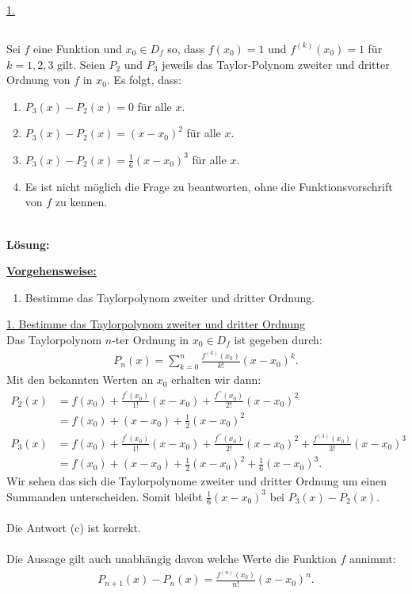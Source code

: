 \underline{1. }\\



\newpage
\subsection*{}
Sei $f$ eine Funktion und $x_0 \in D_f$ so, dass $f(x_0) = 1$ und $f^{(k)}(x_0) = 1$ für $k = 1,2,3$ gilt. Seien $P_2$ und $P_3$ jeweils das Taylor-Polynom zweiter und dritter Ordnung von $f$ in $x_0$. Es folgt, dass:
\renewcommand{\labelenumi}{(\alph{enumi})}
\begin{enumerate}
	\item 
	$P_3(x) - P_2(x) = 0 $ für alle $x$.
	\item
	$P_3(x) - P_2(x) = (x - x_0)^2 $ für alle $x$.
	\item
	$P_3(x) - P_2(x) = \frac{1}{6} (x - x_0)^3 $ für alle $x$.
	\item
	Es ist nicht möglich die Frage zu beantworten, ohne die Funktionsvorschrift von $f$ zu kennen.
\end{enumerate}
\ \\
\textbf{Lösung:}
\begin{mdframed}
	\underline{\textbf{Vorgehensweise:}}
	\renewcommand{\labelenumi}{\theenumi.}
	\begin{enumerate}
		\item Bestimme das Taylorpolynom zweiter und dritter Ordnung.
	\end{enumerate}
\end{mdframed}

\underline{1. Bestimme das Taylorpolynom zweiter und dritter Ordnung}\\
Das Taylorpolynom $n$-ter Ordnung in $x_0 \in D_f$ ist gegeben durch:
\begin{align*}
	P_n(x)
	=
	\sum \limits_{k=0}^n \frac{f^{(k)}(x_0)}{k!} (x-x_0)^k.
\end{align*}
Mit den bekannten Werten an $x_0$ erhalten wir dann:
\begin{align*}
	P_2(x)
	&=
	f(x_0) + \frac{f^\prime(x_0)}{1!} (x- x_0) + \frac{f^{\prime \prime}(x_0)}{2!} (x- x_0)^2\\
	&=
	f(x_0) +  (x- x_0) + \frac{1}{2} (x- x_0)^2\\
	P_3(x)
	&=
	f(x_0) + \frac{f^\prime(x_0)}{1!} (x- x_0) + \frac{f^{\prime \prime}(x_0)}{2!} (x- x_0)^2
	+ \frac{f^{(3)}(x_0)}{3!} (x - x_0)^3\\
	&=
	f(x_0) +  (x- x_0) + \frac{1}{2} (x- x_0)^2 + \frac{1}{6} (x - x_0 )^3.
\end{align*}
Wir sehen das sich die Taylorpolynome zweiter und dritter Ordnung um einen Summanden unterscheiden. Somit bleibt $\frac{1}{6} (x - x_0)^3$ bei $P_3(x) - P_2(x)$.\\
\\
Die Antwort (c) ist korrekt.\\
\\
Die Aussage gilt auch unabhängig davon welche Werte die Funktion $f$ annimmt:
\begin{align*}
	P_{n+1}(x) - P_n(x) = 
	\frac{f^{(n)}(x_0)}{n!}(x - x_0)^n. 
\end{align*} 

